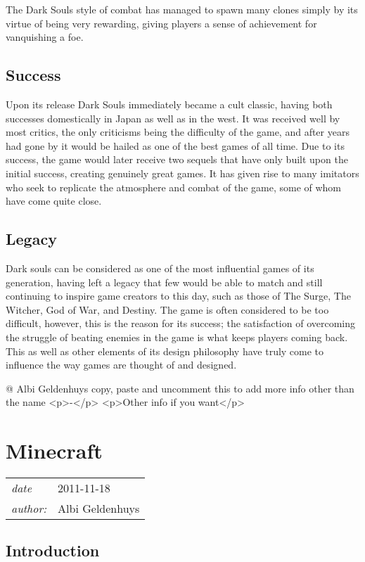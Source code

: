 \documentclass[a4paper,10pt]{book}
\newcommand{\pageHeader}[4]{
    \section{#1}
    \vspace{-0.3cm}
    \begin{table}[h!]
     \begin{tabular}{ll}
        \hline
        \textit{date} & #2 \\
        \textit{author: } & #3\\
        \hline
     \end{tabular}
    \end{table}
    \vspace{-0.3cm}
}
\begin{document}
        The Dark Souls style of combat has managed to spawn many clones simply by
        its virtue of being very rewarding, giving players a sense of achievement for vanquishing a foe.
         
 
 \subsection{Success }
 
          Upon its release Dark Souls immediately became a cult classic, having both successes domestically in
          Japan as well as in the west. It was received well by most critics, the only criticisms being the
          difficulty of the game, and after years had gone by it would be hailed as one of the best games of all
          time. Due to its success, the game would later receive two sequels that have only built upon the initial
          success, creating genuinely great games. It has given rise to many imitators who seek to replicate the
          atmosphere and combat of the game, some of whom have come quite close.
         
 
 \subsection{Legacy }
 
          Dark souls can be considered as one of the most influential games of its generation, having left a
          legacy that few would be able to match and still continuing to inspire game creators to this day, such
          as those of The Surge, The Witcher, God of War, and Destiny. The game is often considered to be too
          difficult, however, this is the reason for its success; the satisfaction of overcoming the struggle of
          beating enemies in the game is what keeps players coming back. This as well as other elements of its
          design philosophy have truly come to influence the way games are thought of and designed.
         
 
 @ Albi Geldenhuys 
  copy, paste and uncomment this to add more info other than the name
            <p>-</p>
            <p>Other info if you want</p>
           
 
 \newpage\pageHeader{Minecraft}{2011-11-18}{Albi Geldenhuys}{The first big indie game}
 \subsection{Introduction }
 
\end{document}
